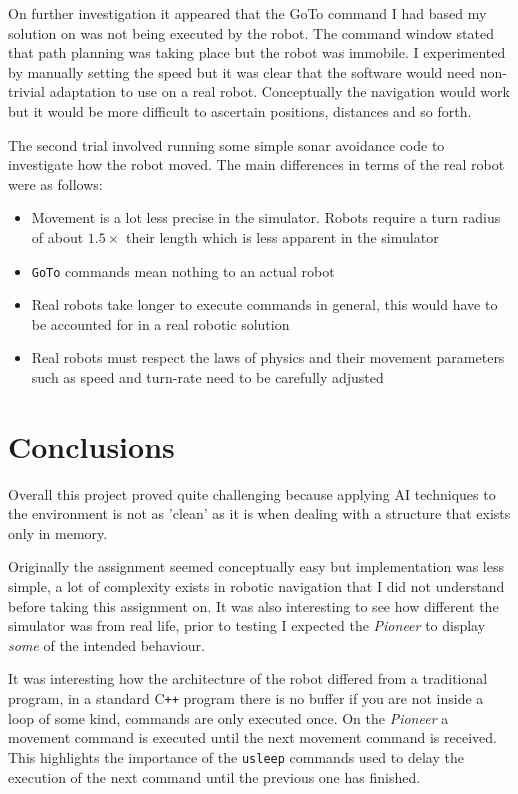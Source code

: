 \documentclass[a4paper,12pt]{article}
\begin{document}
On further investigation it appeared that the GoTo command I had based my solution on was not being executed by the robot. The command window stated that path planning was taking place but the robot was immobile. I experimented by manually setting the speed but it was clear that the software would need non-trivial adaptation to use on a real robot. Conceptually the navigation would work but it would be more difficult to ascertain positions, distances and so forth.

The second trial involved running some simple sonar avoidance code to investigate how the robot moved. The main differences in terms of the real robot were as follows:

\begin{itemize}
    \item{Movement is a lot less precise in the simulator. Robots require a turn radius of about $1.5\times$ their length which is less apparent in the simulator }
    \item{\texttt{GoTo} commands mean nothing to an actual robot}
    \item{Real robots take longer to execute commands in general, this would have to be accounted for in a real robotic solution}
    \item{Real robots must respect the laws of physics and their movement parameters such as speed and turn-rate need to be carefully adjusted}
\end{itemize}

\section{Conclusions}
Overall this project proved quite challenging because applying AI techniques to the environment is not as 'clean' as it is when dealing with a structure that exists only in memory. 

Originally the assignment seemed conceptually easy but implementation was less simple, a lot of complexity exists in robotic navigation that I did not understand before taking this assignment on. It was also interesting to see how different the simulator was from real life, prior to testing I expected the \textit{Pioneer} to display \textit{some} of the intended behaviour.

It was interesting how the architecture of the robot differed from a traditional program, in a standard C\texttt{++} program there is no buffer if you are not inside a loop of some kind, commands are only executed once. On the \textit{Pioneer} a movement command is executed until the next movement command is received. This highlights the importance of the \texttt{usleep} commands used to delay the execution of the next command until the previous one has finished.
\end{document}
